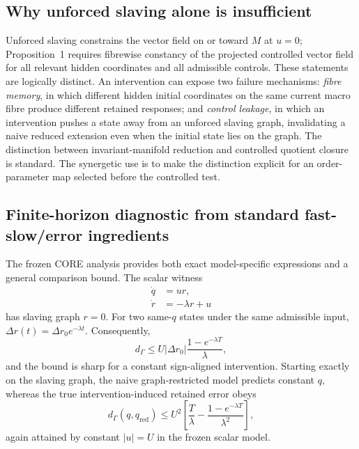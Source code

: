 \subsection{Why unforced slaving alone is insufficient}

Unforced slaving constrains the vector field on or toward $M$ at $u=0$; Proposition~1 requires fibrewise constancy of the projected controlled vector field for all relevant hidden coordinates and all admissible controls. These statements are logically distinct. An intervention can expose two failure mechanisms: \emph{fibre memory}, in which different hidden initial coordinates on the same current macro fibre produce different retained responses; and \emph{control leakage}, in which an intervention pushes a state away from an unforced slaving graph, invalidating a naive reduced extension even when the initial state lies on the graph. The distinction between invariant-manifold reduction and controlled quotient closure is standard. The synergetic use is to make the distinction explicit for an order-parameter map selected before the controlled test.

\subsection{Finite-horizon diagnostic from standard fast-slow/error ingredients}

The frozen CORE analysis provides both exact model-specific expressions and a general comparison bound. The scalar witness
\begin{align}
\dot q &= ur,\\
\dot r &= -\lambda r+u
\end{align}
has slaving graph $r=0$. For two same-$q$ states under the same admissible input, $\Delta r(t)=\Delta r_0 e^{-\lambda t}$. Consequently,
\begin{equation}
d_\Gamma\le U|\Delta r_0|\frac{1-e^{-\lambda T}}{\lambda},
\end{equation}
and the bound is sharp for a constant sign-aligned intervention. Starting exactly on the slaving graph, the naive graph-restricted model predicts constant $q$, whereas the true intervention-induced retained error obeys
\begin{equation}
d_\Gamma(q,q_{\mathrm{red}})\le U^2\left[\frac{T}{\lambda}-\frac{1-e^{-\lambda T}}{\lambda^2}\right],
\end{equation}
again attained by constant $|u|=U$ in the frozen scalar model.

